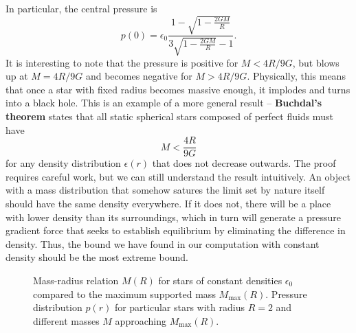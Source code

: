 In particular, the central pressure is
\begin{equation}
	p(0) = \epsilon_0 \frac{1 - \sqrt{1 - \frac{2GM}{R}}}{3 \sqrt{1-\frac{2GM}{R}} - 1} .
	\label{eq:incompressible_star:core_pressure}
\end{equation}
It is interesting to note that the pressure is positive for $M < 4R/9G$, but blows up at $M = 4R/9G$ and becomes negative for $M > 4R/9G$.
Physically, this means that once a star with fixed radius becomes massive enough, it implodes and turns into a black hole.
This is an example of a more general result -- \textbf{Buchdal's theorem} states that all static spherical stars composed of perfect fluids must have
\begin{equation}
	M < \frac{4R}{9G}
	\label{eq:incompressible_star:buchdal}
\end{equation}
for any density distribution $\epsilon(r)$ that does not decrease outwards. \cite{ref:buchdal}
The proof requires careful work, but we can still understand the result intuitively.
An object with a mass distribution that somehow satures the limit set by nature itself should have the same density everywhere.
If it does not, there will be a place with lower density than its surroundings, which in turn will generate a pressure gradient force that seeks to establish equilibrium by eliminating the difference in density.
Thus, the bound we have found in our computation with constant density should be the most extreme bound.

\begin{figure}[hb!]
\centering
{}
\caption{Mass-radius relation $M(R)$ for stars of constant densities $\epsilon_0$ compared to the maximum supported mass $M_\text{max}(R)$. Pressure distribution $p(r)$ for particular stars with radius $R=2$ and different masses $M$ approaching $M_\text{max}(R)$.}
\end{figure}

